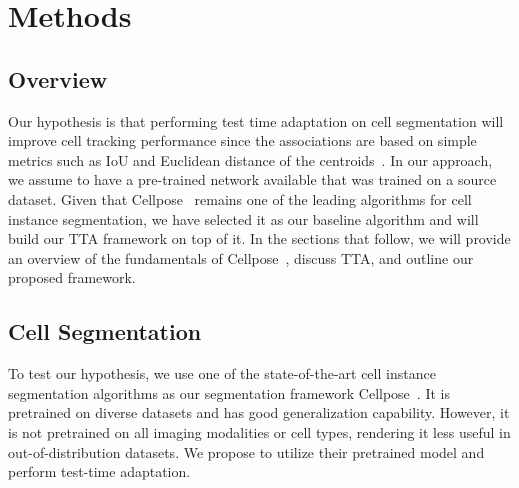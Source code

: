 \section{Methods}

\subsection{Overview}
Our hypothesis is that performing test time adaptation on cell segmentation will improve cell tracking performance since the associations are based on simple metrics such as IoU and Euclidean distance of the centroids~\cite{bragantini2024ultrack}. In our approach, we assume to have a pre-trained network available that was trained on a source dataset. Given that Cellpose~\cite{stringer2021cellpose} remains one of the leading algorithms for cell instance segmentation, we have selected it as our baseline algorithm and will build our TTA framework on top of it. In the sections that follow, we will provide an overview of the fundamentals of Cellpose~\cite{stringer2021cellpose}, discuss TTA, and outline our proposed framework.



\subsection{Cell Segmentation}

To test our hypothesis, we use one of the state-of-the-art cell instance segmentation algorithms as our segmentation framework Cellpose~\cite{stringer2021cellpose}. It is pretrained on diverse datasets and has good generalization capability. However, it is not pretrained on all imaging modalities or cell types, rendering it less useful in out-of-distribution datasets. We propose to utilize their pretrained model and perform test-time adaptation. 

